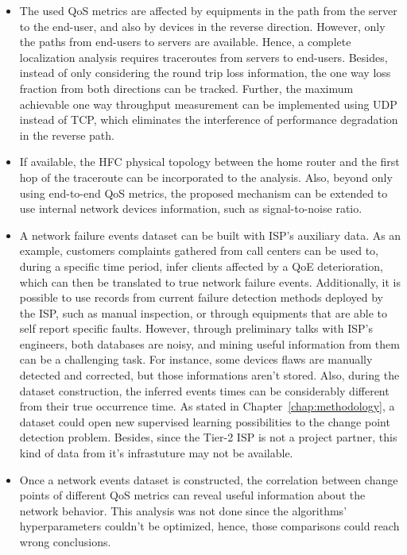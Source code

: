 \begin{itemize}
\item
The used QoS metrics are affected by equipments in the path from the server to
the end-user, and also by devices in the reverse direction.
However, only the paths from end-users to servers are available.
Hence, a complete
localization analysis requires traceroutes from servers to end-users.
Besides, instead of only considering the round trip loss information,
the one way loss fraction from both directions can be tracked.
Further, the maximum achievable one way throughput measurement can be
implemented using UDP instead of TCP, which eliminates the interference of
performance degradation in the reverse path.

\item
If available, the HFC physical topology between the home router and the
first hop of the traceroute can be incorporated to the analysis.
Also, beyond only using end-to-end QoS metrics,
the proposed mechanism can be extended
to use internal network devices information, such as signal-to-noise ratio.

\item
A network failure events dataset can be built with ISP's auxiliary data.
As an example, customers complaints gathered from call centers can be used to,
during a specific time period, infer clients affected by a QoE deterioration,
which can then be translated to true network failure events.
Additionally, it is possible to use records from current failure detection
methods deployed by the ISP, such as manual inspection, or through equipments
that are able to self report specific faults.
However, through preliminary talks with ISP's engineers,
both databases are noisy, and mining useful information
from them can be a challenging task.
For instance, some devices flaws are manually
detected and corrected, but those informations aren't stored.
Also, during the dataset construction, the inferred events times can be
considerably different from their true occurrence time.
As stated in Chapter~\ref{chap:methodology}, a dataset could open new
supervised learning possibilities to the change point detection problem.
Besides, since the Tier-2 ISP is not a project partner, this kind of data from
it's infrastuture may not be available.

\item
Once a network events dataset is constructed, the correlation between
change points of different QoS metrics can reveal useful information
about the network behavior. This analysis was not done since the algorithms'
hyperparameters couldn't be optimized, hence, those comparisons could reach
wrong conclusions.


\end{itemize}
